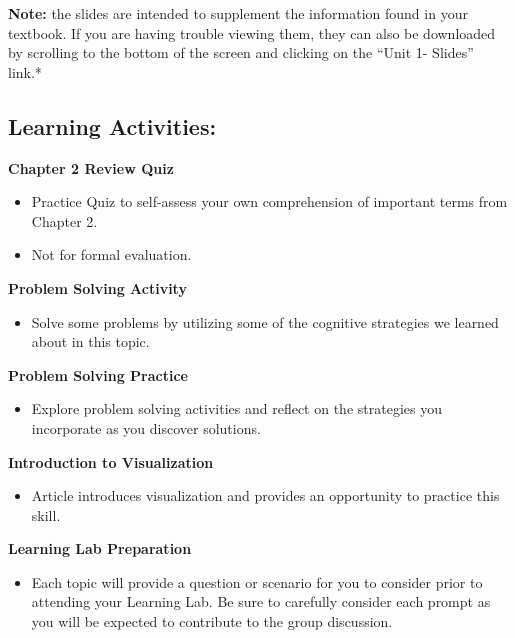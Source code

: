 \documentclass[
]{book}
\providecommand{\tightlist}{%
  \setlength{\itemsep}{0pt}\setlength{\parskip}{0pt}}
\begin{document}
\begin{caution}
\textbf{Note:} the slides are intended to supplement the information found in your textbook. If you are having trouble viewing them, they can also be downloaded by scrolling to the bottom of the screen and clicking on the ``Unit 1- Slides'' link.*
\end{caution}

\hypertarget{learning-activities}{%
\subsection*{Learning Activities:}\label{learning-activities}}

\begin{reflect}
\textbf{Chapter 2 Review Quiz}

\begin{itemize}
\tightlist
\item
  Practice Quiz to self-assess your own comprehension of important terms from Chapter 2.\\
\item
  Not for formal evaluation.
\end{itemize}

\textbf{Problem Solving Activity}

\begin{itemize}
\tightlist
\item
  Solve some problems by utilizing some of the cognitive strategies we learned about in this topic.
\end{itemize}

\textbf{Problem Solving Practice}

\begin{itemize}
\tightlist
\item
  Explore problem solving activities and reflect on the strategies you incorporate as you discover solutions.
\end{itemize}

\textbf{Introduction to Visualization}

\begin{itemize}
\tightlist
\item
  Article introduces visualization and provides an opportunity to practice this skill.
\end{itemize}

\textbf{Learning Lab Preparation}

\begin{itemize}
\tightlist
\item
  Each topic will provide a question or scenario for you to consider prior to attending your Learning Lab. Be sure to carefully consider each prompt as you will be expected to contribute to the group discussion.
\end{itemize}
\end{reflect}
\end{document}
